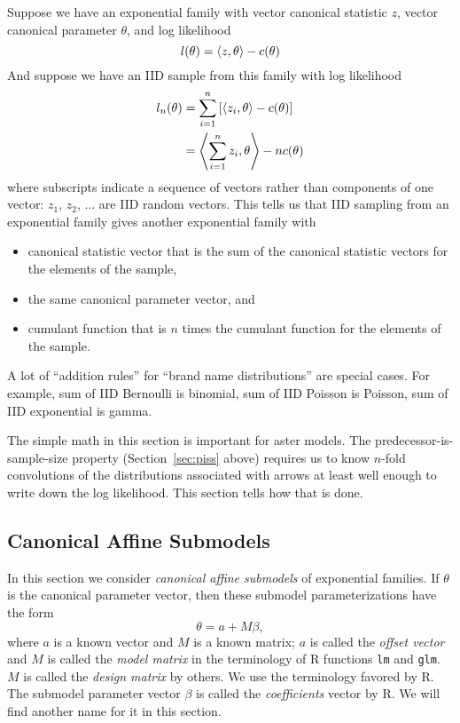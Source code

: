 Suppose we have an exponential family with vector canonical statistic $z$,
vector canonical parameter $\theta$, and log likelihood
$$
   l(\theta) = \langle z, \theta \rangle - c(\theta)
$$
And suppose we have an IID sample
from this family with log likelihood
\begin{equation} \label{eq:iid}
\begin{split}
   l_n(\theta)
   & =
   \sum_{i = 1}^n \left[ \langle z_i, \theta \rangle - c(\theta) \right]
   \\
   & =
   \left\langle \sum_{i = 1}^n z_i, \theta \right\rangle - n c(\theta)
\end{split}
\end{equation}
where subscripts indicate a sequence of vectors rather than components
of one vector: $z_1$, $z_2$, $\ldots$ are IID random vectors.
This tells us that IID sampling from an exponential family gives another
exponential family with
\begin{itemize}
\item canonical statistic vector that is the sum of the canonical statistic
    vectors for the elements of the sample,
\item the same canonical parameter vector, and
\item cumulant function that is $n$ times
    the cumulant function for the elements of the sample.
\end{itemize}

A lot of ``addition rules'' for ``brand name distributions''
are special cases.  For example, sum of IID Bernoulli is binomial, sum of
IID Poisson is Poisson, sum of IID exponential is gamma.

The simple math in this section is important for aster models.
The predecessor-is-sample-size property (Section~\ref{sec:piss} above)
requires us to know
$n$-fold convolutions of the distributions associated with arrows at least
well enough to write down the log likelihood.  This section tells how that
is done.

\subsection{Canonical Affine Submodels}
\label{sec:canonical-affine-submodel}

In this section we consider \emph{canonical affine submodels} of exponential
families.  If $\theta$ is the canonical parameter vector, then these
submodel parameterizations have the form
\begin{equation} \label{eq:affine}
   \theta = a + M \beta,
\end{equation}
where $a$ is a known vector and $M$ is a known matrix; $a$ is called the
\emph{offset vector} and $M$ is called the \emph{model matrix} in the
terminology of R functions \texttt{lm} and \texttt{glm}.
$M$ is called the \emph{design matrix} by others.
We use the terminology favored by R.
The submodel parameter vector $\beta$ is called the \emph{coefficients}
vector by R.  We will find another name for it in this section.

